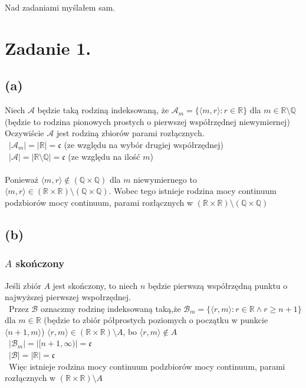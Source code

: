 \documentclass{article}
\begin{document}
\newcommand{\imp}{\Rightarrow}
\newcommand{\lub}{\vee}
\newcommand{\roz}{\setminus}
\newcommand{\zbp}{\emptyset}
\newcommand{\zbpot}{\mathcal{P}}
\newcommand{\troj}{\bigtriangleup}
\newcommand{\nat}{\mathbb{N}}
\newcommand{\calk}{\mathbb{Z}}
\newcommand{\rze}{\mathbb{R}}
\newcommand{\wegde}{\wedge}
\newcommand{\eps}{\varepsilon}
\newcommand{\con}{\mathfrak{c}}
\maketitle
Nad zadaniami myślałem sam. 
\section*{Zadanie 1.}
\subsection*{(a)}
Niech $\mathcal{A}$ będzie taką rodziną indeksowaną, że $\mathcal{A}_m = \{\langle m,r\rangle : r \in \rze \}$ dla $m\in \rze \setminus \mathbb{Q}$ (będzie to rodzina pionowych prostych o pierwszej współrzędnej niewymiernej) 
Oczywiście $\mathcal{A}$ jest rodziną zbiorów parami rozłącznych.\\\
$\vert \mathcal{A}_m \vert = \vert \rze \vert = \con $ (ze względu na wybór drugiej współrzędnej)\\\
$\vert \mathcal{A} \vert = \vert \rze \setminus \mathbb{Q}\vert  = \con$ (ze względu na ilość $m$)\\\\
Ponieważ $\langle m,r\rangle \notin (\mathbb{Q} \times \mathbb{Q})$ dla $m$ niewymiernego to $\langle m,r\rangle \in (\rze \times \rze) \setminus ( \mathbb{Q} \times \mathbb{Q}) $.
Wobec tego istnieje rodzina mocy continuum podzbiorów mocy continuum, parami rozłącznych w $(\rze \times \rze) \setminus ( \mathbb{Q} \times \mathbb{Q})$

\subsection*{(b)}
\subsubsection*{$A$ skończony}
Jeśli zbiór $A$ jest skończony, to niech $n$ będzie pierwszą współrzędną punktu o najwyższej pierwszej wspołrzędnej. \\\
Przez $\mathcal{B}$ oznaczmy rodzinę indeksowaną taką,że $\mathcal{B}_m = \{\langle r,m\rangle : r \in \rze \wedge r\geq n+1\}$ dla $m\in \rze$ (będzie to zbiór półprostych poziomych o początku w punkcie $\langle n+1,m \rangle$) $\langle r,m \rangle \in (\rze \times \rze)\roz A$, bo $\langle r,m \rangle \notin A$
\\\
$\vert \mathcal{B}_m \vert = \vert [n+1, \infty) \vert =\con $\\\
$\vert \mathcal{B} \vert = \vert \rze \vert = \con $\\\
Więc istnieje rodzina mocy continuum podzbiorów mocy continuum, parami rozłącznych w $(\rze \times \rze) \setminus A$
\end{document}
